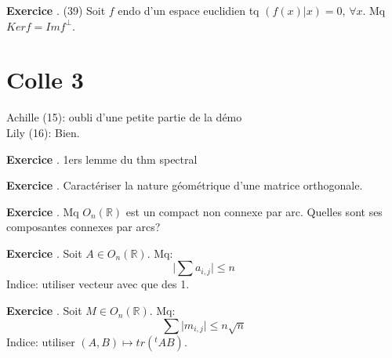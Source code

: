 \documentclass[10pt,a4paper]{article}
\newcounter{question}
\newcounter{exo}
\newenvironment{exo}{\vspace{0.5cm}\setcounter{question}{0}\addtocounter{exo}{1} \noindent \textbf{Exercice \theexo}. \normalsize }{\par}
\begin{document}
	\begin{exo}
		(39) Soit $f$ endo d'un espace euclidien tq $(f(x) \vert x) = 0$, $\forall x$. Mq $Ker f = Im f ^\perp$.
	\end{exo}
	
\section*{Colle 3}
	\setcounter{exo}{0}
	Achille (15): oubli d'une petite partie de la démo\\
	Lily (16): Bien.\\
	
	\begin{exo}
		1ers lemme du thm spectral
	\end{exo}

	\begin{exo}
		Caractériser la nature géométrique d'une matrice orthogonale.
	\end{exo}
	
	\begin{exo}
		Mq $O_n(\mathbb{R})$ est un compact non connexe par arc. Quelles sont ses composantes connexes par arcs?
	\end{exo}
	
	\begin{exo}
		Soit $A \in O_n(\mathbb{R})$. Mq:
		$$\vert \sum a_{i,j} \vert \leq n$$ 
		Indice: utiliser vecteur avec que des 1.
	\end{exo}
	
	\begin{exo}
		Soit $M \in O_n(\mathbb{R})$. Mq:
		$$\sum \vert m_{i,j} \vert \leq n \sqrt{n}$$ 
		Indice: utiliser $(A, B) \longmapsto tr({}^t A B)$.
	\end{exo}
\end{document}
